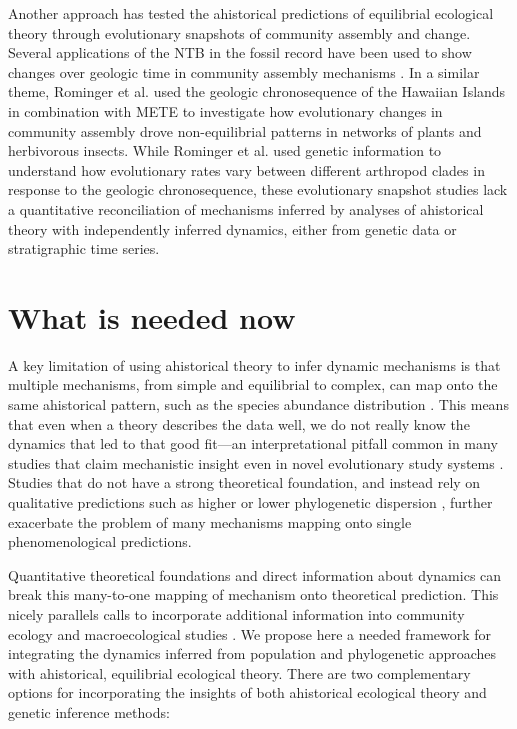 \documentclass[12pt]{article}
\begin{document}
Another approach has tested the ahistorical predictions of equilibrial
ecological theory through evolutionary snapshots of community assembly
and change. Several applications of the NTB in the fossil record have
been used to show changes over geologic time in community assembly
mechanisms \citep{Olszewski2004-ud, Wagner2006-te}. In a similar theme,
Rominger et al. \citep{Rominger2015-kb} used the geologic
chronosequence of the Hawaiian Islands in combination with METE to
investigate how evolutionary changes in community assembly drove
non-equilibrial patterns in networks of plants and herbivorous
insects. While Rominger et al. used genetic information to understand
how evolutionary rates vary between different arthropod clades in
response to the geologic chronosequence, these evolutionary snapshot
studies lack a quantitative reconciliation of mechanisms inferred by
analyses of ahistorical theory with independently inferred dynamics,
either from genetic data or stratigraphic time series.

\section{What is needed now}

A key limitation of using ahistorical theory to infer dynamic
mechanisms is that multiple mechanisms, from simple and equilibrial to
complex, can map onto the same ahistorical pattern, such as the
species abundance distribution \citep{Kendall1948-pj, Kendall1948-ri,
  Engen1996-jt, Engen1996-na, McGill2003-sf}.  This means that even
when a theory describes the data well, we do not really know the
dynamics that led to that good fit---an interpretational pitfall
common in many studies that claim mechanistic insight even in novel
evolutionary study systems \citep{Hubbell2001-dx, Olszewski2004-ud,
  Wagner2006-te}.  Studies that do not have a strong theoretical
foundation, and instead rely on qualitative predictions such as higher
or lower phylogenetic dispersion \citep{Webb2002-yr}, further
exacerbate the problem of many mechanisms mapping onto single
phenomenological predictions.

Quantitative theoretical foundations and direct information about
dynamics can break this many-to-one mapping of mechanism onto
theoretical prediction. This nicely parallels calls to incorporate
additional information into community ecology and macroecological
studies \citep{McGill2007-zd}. We propose here a needed
framework for integrating the dynamics inferred from population and
phylogenetic approaches with ahistorical, equilibrial ecological
theory. There are two complementary options for incorporating the
insights of both ahistorical ecological theory and genetic inference
methods:
\end{document}
